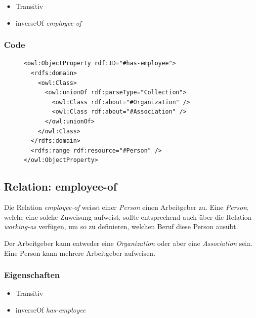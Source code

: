 \documentclass[
    11pt,
    latin1,
    a4paper,
    oneside
]{scrreprt}
\begin{document}
\begin{itemize}
  \item Transitiv
  \item inverseOf \emph{employee-of}
\end{itemize}

\subsubsection{Code} \label{sec:rel_hasemployee_code}

\begin{figure}[H]
 \lstset{language=XML}
 \begin{lstlisting}[label=owl:hasemployee,caption={Die Relation \emph{has-employee} gibt an, welche \emph{Person} bei der \emph{Organization} oder \emph{Association} angestellt sind}]
<owl:ObjectProperty rdf:ID="#has-employee">
  <rdfs:domain>
    <owl:Class>
      <owl:unionOf rdf:parseType="Collection">
        <owl:Class rdf:about="#Organization" />
        <owl:Class rdf:about="#Association" />
      </owl:unionOf>
    </owl:Class>
  </rdfs:domain>
  <rdfs:range rdf:resource="#Person" />
</owl:ObjectProperty>
 \end{lstlisting}
\end{figure}


\subsection{Relation: employee-of} \label{sec:rel_employeeof}

Die Relation \emph{employee-of} weisst einer \emph{Person} einen Arbeitgeber zu. Eine \emph{Person}, welche eine solche Zuweisung aufweist, sollte entsprechend auch über die Relation \emph{working-as} verf\"ugen, um so zu definieren, welchen Beruf diese Person aus\"ubt.

Der Arbeitgeber kann entweder eine \emph{Organization} oder aber eine \emph{Association} sein. Eine Person kann mehrere Arbeitgeber aufweisen.

\subsubsection{Eigenschaften} \label{sec:rel_employeeof_settings}

\begin{itemize}
  \item Transitiv
  \item inverseOf \emph{has-employee}
\end{itemize}
\end{document}
